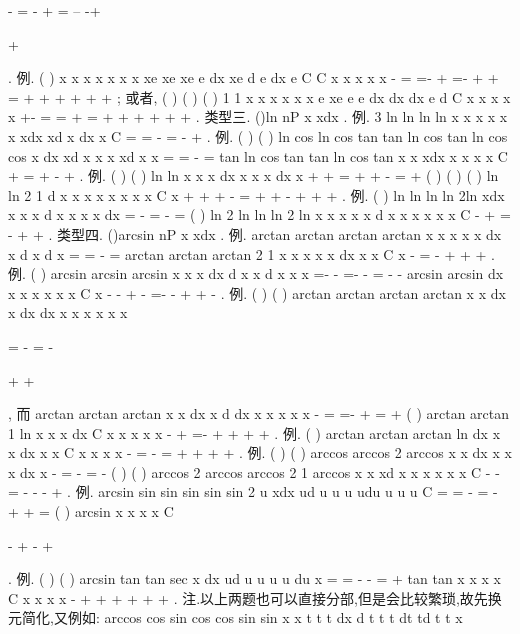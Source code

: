 -
=
-
+
=
--
-+


+


\int 
. 
\textcolor{lyred}{例}.
(
)
x
x
x
x
x
x
x
xe
xe
xe
e
dx
xe d
e dx
e
C
C
x
x
x
x
x
-
=
=-
+
=-
+
+
=
+
+
+
+
+
+
\int 
\int 
\int 
; 
或者,
(
)
(
)
(
)
1 1
x
x
x
x
x
x
e
xe
e
e
dx
dx
dx
e d
C
x
x
x
x
x
+-
=
=
+
=
+
+
+
+
+
+
\int 
\int 
\int 
\int 
. 
\textcolor{lyred}{类型三}.
()ln
nP
x
xdx
\int 
. 
\textcolor{lyred}{例}.
3 ln
ln
ln
ln
x
x
x
x
x
x
xdx
xd
x
dx
x
C
=
=
-
=
-
+
\int 
\int 
\int 
. 
\textcolor{lyred}{例}.
(
)
(
)
ln cos
ln cos
tan
tan
ln cos
tan
ln cos
cos
x dx
xd
x
x
x
xd
x
x
=
=
-
=
\int 
\int 
\int 
tan
ln cos
tan
tan
ln cos
tan
x
x
xdx
x
x
x
x
C
+
=
+
-
+
\int 
. 
\textcolor{lyred}{例}.
(
)
(
)
ln
ln
x
x
x
dx
x
x
x
dx
x
+
+
=
+
+
-
=
+
\int 
\int 
(
)
(
)
(
)
ln
ln
2 1
d
x
x
x
x
x
x
x
x
C
x
+
+
+
-
=
+
+
-
+
+
+
\int 
. 
\textcolor{lyred}{例}.
(
)
ln
ln
ln
ln
2ln
xdx
x
x
x d
x
x
x
x dx
=
-
\cdots 
=
-
\cdots 
=
\int 
\int 
\int 
(
)
ln
2 ln
ln
ln
2 ln
x
x
x
x
x d
x
x
x
x
x
x
C
-
+
\cdots 
=
-
+
+
\int 
. 
\textcolor{lyred}{类型四}.
()arcsin
nP
x
xdx
\int 
. 
\textcolor{lyred}{例}.
arctan
arctan
arctan
arctan
x
x
x
x
x dx
x d
x
d
x
\cdots 
=
\cdots 
=
-
=
\int 
\int 
\int 
arctan
arctan
arctan
2 1
x
x
x
x
x
dx
x
x
C
x
-
=
-
+
+
+
\int 
. 
\textcolor{lyred}{例}.
(
)
arcsin
arcsin
arcsin
x
x
x
dx
d
x
x d
x
x
x
=-
-
=-
\cdots 
-
=
-
-
\int 
\int 
\int 
arcsin
arcsin
dx
x
x
x
x
x
x
C
x
-
-
+
-
=-
-
+
+
-
\int 
. 
\textcolor{lyred}{例}.
(
)
(
)
arctan
arctan
arctan
arctan
x
x
dx
x
dx
dx
x
x
x
x
x
x


=
-
=
-


+
+


\int 
\int 
\int 
, 
而
arctan
arctan
arctan
x
x
dx
x d
dx
x
x
x
x
x
-
=
\cdots 
=-
+
\cdots 
=
+
\int 
\int 
\int 
(
)
arctan
arctan
1 ln
x
x
x
dx
C
x
x
x
x
x
-
+
=-
+
+
+
+
\int 
. 
\textcolor{lyred}{例}.
(
)
arctan
arctan
arctan
ln
dx
x
x
dx
x
x
C
x
x
x
x
-
=
-
\cdots 
=
+
+
+
+
\int 
\int 
. 
\textcolor{lyred}{例}. (
)
(
)
arccos
arccos
2 arccos
x
x
dx
x
x
x
dx
x
-
=
-
\cdots 
=
-
\int 
\int 
(
)
(
)
arccos
2 arccos
arccos
2 1
arccos
x
x
xd
x
x
x
x
x
x
C
-
-
=
-
-
-
+
\int 
. 
\textcolor{lyred}{例}.
arcsin
sin
sin
sin
sin
sin 2
u
xdx
ud
u
u
u
udu
u
u
u
C
=
=
-
=
-
+
+
=
\int 
\int 
\int 
(
)
arcsin
x
x
x
x
C


-
+
-
+




. 
\textcolor{lyred}{例}.
(
)
(
)
arcsin
tan
tan
sec
x dx
ud
u
u
u
u
du
x
=
=
-
-
=
+
\int 
\int 
\int 
tan
tan
x
x
x
x
C
x
x
x
x
-
+
+
+
+
+
+
. 
\textcolor{lyred}{注}.以上两题也可以直接分部,但是会比较繁琐,故先换元简化,又例如: 
arccos
cos
sin
cos
cos
sin
sin
x
x
t
t
t
dx
d
t
t
t dt
td
t
t
x



